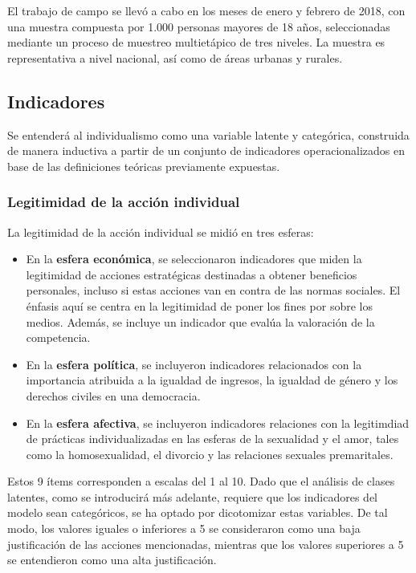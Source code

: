 \documentclass[
  letterpaper,
  DIV=11,
  numbers=noendperiod]{scrartcl}
\begin{document}
El trabajo de campo se llevó a cabo en los meses de enero y febrero de
2018, con una muestra compuesta por 1.000 personas mayores de 18 años,
seleccionadas mediante un proceso de muestreo multietápico de tres
niveles. La muestra es representativa a nivel nacional, así como de
áreas urbanas y rurales.

\subsection{Indicadores}\label{indicadores}

Se entenderá al individualismo como una variable latente y categórica,
construida de manera inductiva a partir de un conjunto de indicadores
operacionalizados en base de las definiciones teóricas previamente
expuestas.

\subsubsection{Legitimidad de la acción
individual}\label{legitimidad-de-la-acciuxf3n-individual-1}

La legitimidad de la acción individual se midió en tres esferas:

\begin{itemize}
\item
  En la \textbf{esfera económica}, se seleccionaron indicadores que
  miden la legitimidad de acciones estratégicas destinadas a obtener
  beneficios personales, incluso si estas acciones van en contra de las
  normas sociales. El énfasis aquí se centra en la legitimidad de poner
  los fines por sobre los medios. Además, se incluye un indicador que
  evalúa la valoración de la competencia.
\item
  En la \textbf{esfera política}, se incluyeron indicadores relacionados
  con la importancia atribuida a la igualdad de ingresos, la igualdad de
  género y los derechos civiles en una democracia.
\item
  En la \textbf{esfera afectiva}, se incluyeron indicadores relaciones
  con la legitimdiad de prácticas individualizadas en las esferas de la
  sexualidad y el amor, tales como la homosexualidad, el divorcio y las
  relaciones sexuales premaritales.
\end{itemize}

Estos 9 ítems corresponden a escalas del 1 al 10. Dado que el análisis
de clases latentes, como se introducirá más adelante, requiere que los
indicadores del modelo sean categóricos, se ha optado por dicotomizar
estas variables. De tal modo, los valores iguales o inferiores a 5 se
consideraron como una baja justificación de las acciones mencionadas,
mientras que los valores superiores a 5 se entendieron como una alta
justificación.
\end{document}
